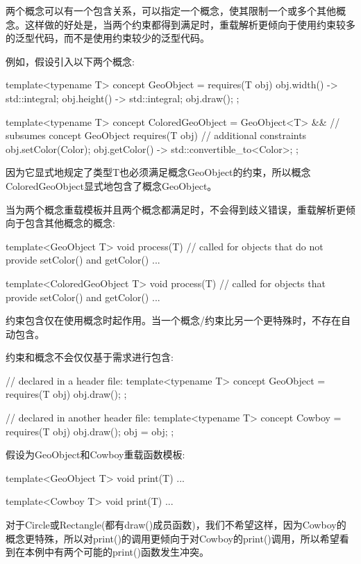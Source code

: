
两个概念可以有一个包含关系，可以指定一个概念，使其限制一个或多个其他概念。这样做的好处是，当两个约束都得到满足时，重载解析更倾向于使用约束较多的泛型代码，而不是使用约束较少的泛型代码。

例如，假设引入以下两个概念:

\begin{cpp}
template<typename T>
concept GeoObject = requires(T obj) {
	{ obj.width() } -> std::integral;
	{ obj.height() } -> std::integral;
	obj.draw();
};

template<typename T>
concept ColoredGeoObject =
	GeoObject<T> && // subsumes concept GeoObject
	requires(T obj) { // additional constraints
		obj.setColor(Color{});
		{ obj.getColor() } -> std::convertible_to<Color>;
	};
\end{cpp}

因为它显式地规定了类型T也必须满足概念GeoObject的约束，所以概念ColoredGeoObject显式地包含了概念GeoObject。

当为两个概念重载模板并且两个概念都满足时，不会得到歧义错误，重载解析更倾向于包含其他概念的概念:

\begin{cpp}
template<GeoObject T>
void process(T) // called for objects that do not provide setColor() and getColor()
{
	...
}

template<ColoredGeoObject T>
void process(T) // called for objects that provide setColor() and getColor()
{
	...
}
\end{cpp}

约束包含仅在使用概念时起作用。当一个概念/约束比另一个更特殊时，不存在自动包含。

约束和概念不会仅仅基于需求进行包含:

\begin{cpp}
// declared in a header file:
template<typename T>
concept GeoObject = requires(T obj) {
						obj.draw();
					};
					
// declared in another header file:
template<typename T>
concept Cowboy = requires(T obj) {
					obj.draw();
					obj = obj;
				};
\end{cpp}

假设为GeoObject和Cowboy重载函数模板:

\begin{cpp}
template<GeoObject T>
void print(T) {
	...
}

template<Cowboy T>
void print(T) {
	...
}
\end{cpp}

对于Circle或Rectangle(都有draw()成员函数)，我们不希望这样，因为Cowboy的概念更特殊，所以对print()的调用更倾向于对Cowboy的print()调用，所以希望看到在本例中有两个可能的print()函数发生冲突。

